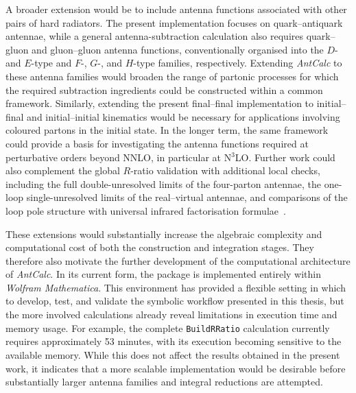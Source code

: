 A broader extension would be to include antenna functions associated with other pairs of hard
radiators. The present implementation focuses on quark--antiquark antennae, while a general
antenna-subtraction calculation also requires quark--gluon and gluon--gluon antenna functions,
conventionally organised into the $D$- and $E$-type and $F$-, $G$-, and $H$-type families,
respectively. Extending \textit{AntCalc} to these antenna families would broaden the range of partonic
processes for which the required subtraction ingredients could be constructed within a common
framework. Similarly, extending the present final--final implementation to initial--final and
initial--initial kinematics would be necessary for applications involving coloured partons in the
initial state. In the longer term, the same framework could provide a basis for investigating the
antenna functions required at perturbative orders beyond NNLO, in particular at N$^3$LO. Further work could also complement the global $R$-ratio validation with additional local checks, including the full double-unresolved limits of the four-parton antennae, the one-loop single-unresolved limits of the real--virtual antennae, and comparisons of the loop pole structure with universal infrared factorisation formulae~\cite{Catani:1998bh}.

These extensions would substantially increase the algebraic complexity and computational cost of both
the construction and integration stages. They therefore also motivate the further development of the
computational architecture of \textit{AntCalc}. In its current form, the package is implemented
entirely within \textit{Wolfram Mathematica}. This environment has provided a flexible setting in which
to develop, test, and validate the symbolic workflow presented in this thesis, but the more involved
calculations already reveal limitations in execution time and memory usage. For example, the complete
\texttt{BuildRRatio} calculation currently requires approximately 53 minutes, with
its execution becoming sensitive to the available memory. While this does not affect the results
obtained in the present work, it indicates that a more scalable implementation would be desirable
before substantially larger antenna families and integral reductions are attempted.

